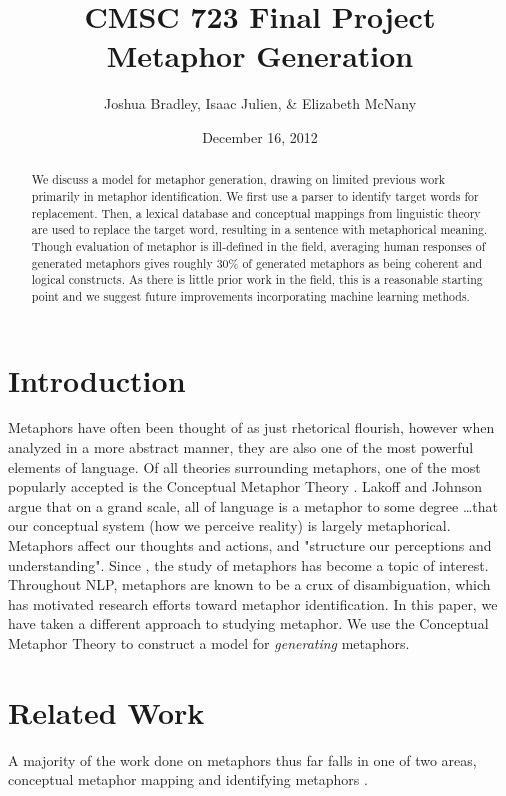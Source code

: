 \documentclass[12pt]{article}
\title{CMSC 723 Final Project\\
Metaphor Generation}
\author{Joshua Bradley, Isaac Julien, \& Elizabeth McNany}
\date{December 16, 2012}
\begin{document}
\maketitle

\begin{abstract}
We discuss a model for metaphor generation, drawing on limited previous work primarily in metaphor identification.  We first use a parser to identify target words for replacement.  Then, a lexical database and conceptual mappings from linguistic theory are used to replace the target word, resulting in a sentence with metaphorical meaning.  Though evaluation of metaphor is ill-defined in the field, averaging human responses of generated metaphors gives roughly 30\% of generated metaphors as being coherent and logical constructs.  As there is little prior work in the field, this is a reasonable starting point and we suggest future improvements incorporating machine learning methods.
\end{abstract}

\newpage
\tableofcontents
\newpage

\section{Introduction}

Metaphors have often been thought of as just rhetorical flourish, however when analyzed in a more abstract manner, they are also one of the most powerful elements of language. Of all theories surrounding metaphors, one of the most popularly accepted is the Conceptual Metaphor Theory \cite{lakoff80}. Lakoff and Johnson argue that on a grand scale, all of language is a metaphor to some degree \ldots that our conceptual system (how we perceive reality) is largely metaphorical. Metaphors affect our thoughts and actions, and "structure our perceptions and understanding". Since \cite{lakoff80}, the study of metaphors has become a topic of interest. Throughout NLP, metaphors are known to be a crux of disambiguation, which has motivated research efforts toward metaphor identification. In this paper, we have taken a different approach to studying metaphor. We use the Conceptual Metaphor Theory to construct a model for \emph{generating} metaphors.

\section{Related Work}

A majority of the work done on metaphors thus far falls in one of two areas, conceptual metaphor mapping \cite{lakoff80}\cite{lakoff89} and identifying metaphors \cite{shutova101}\cite{pragglejaz}.
\end{document}
